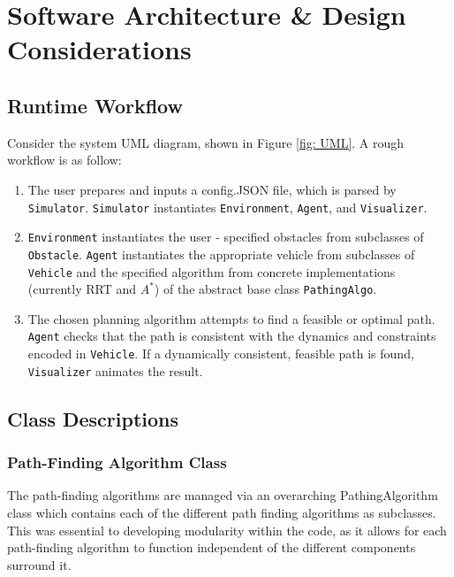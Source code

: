 \documentclass[10pt,letterpaper]{article}
\begin{document}
\section{Software Architecture \& Design Considerations}

\subsection{Runtime Workflow}

Consider the system UML diagram, shown in Figure \ref{fig: UML}. A rough workflow is as follow:

\begin{enumerate}
    \item The user prepares and inputs a config.JSON file, which is parsed by \texttt{Simulator}. \texttt{Simulator} instantiates \texttt{Environment}, \texttt{Agent}, and \texttt{Visualizer}.
    
    \item \texttt{Environment} instantiates the user - specified obstacles from subclasses of \texttt{Obstacle}. \texttt{Agent} instantiates the appropriate vehicle from subclasses of  \texttt{Vehicle} and the specified algorithm from concrete implementations (currently RRT and $A^*$) of the abstract base class \texttt{PathingAlgo}.
    
    \item The chosen planning algorithm attempts to find a feasible or optimal path. \texttt{Agent} checks that the path is consistent with the dynamics and constraints encoded in \texttt{Vehicle}. If a dynamically consistent, feasible path is found, \texttt{Visualizer} animates the result.
    
\end{enumerate}

\subsection{Class Descriptions}

\subsubsection*{Path-Finding Algorithm Class}
The path-finding algorithms are managed via an overarching PathingAlgorithm class which contains each of the different path finding algorithms as subclasses. This was essential to developing modularity within the code, as it allows for each path-finding algorithm to function independent of the different components surround it.
\end{document}

